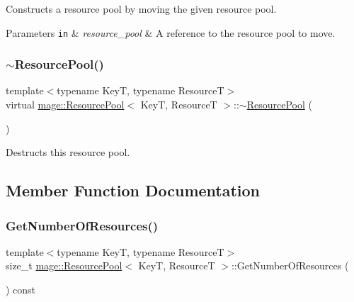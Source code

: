 Constructs a resource pool by moving the given resource pool.


\begin{DoxyParams}[1]{Parameters}
\mbox{\tt in}  & {\em resource\+\_\+pool} & A reference to the resource pool to move. \\
\hline
\end{DoxyParams}
\hypertarget{classmage_1_1_resource_pool_ae4fff3d951818d417f77965c2db265f6}{}\label{classmage_1_1_resource_pool_ae4fff3d951818d417f77965c2db265f6} 
\subsubsection{\texorpdfstring{$\sim$\+Resource\+Pool()}{~ResourcePool()}}
{\footnotesize\ttfamily template$<$typename KeyT, typename ResourceT$>$ \\
virtual \hyperlink{classmage_1_1_resource_pool}{mage\+::\+Resource\+Pool}$<$ KeyT, ResourceT $>$\+::$\sim$\hyperlink{classmage_1_1_resource_pool}{Resource\+Pool} (\begin{DoxyParamCaption}{ }\end{DoxyParamCaption})\hspace{0.3cm}{\ttfamily [virtual]}}

Destructs this resource pool. 

\subsection{Member Function Documentation}
\hypertarget{classmage_1_1_resource_pool_ae2f9964a1821c9b8cb38303a5a88c98e}{}\label{classmage_1_1_resource_pool_ae2f9964a1821c9b8cb38303a5a88c98e} 
\subsubsection{\texorpdfstring{Get\+Number\+Of\+Resources()}{GetNumberOfResources()}}
{\footnotesize\ttfamily template$<$typename KeyT, typename ResourceT$>$ \\
size\+\_\+t \hyperlink{classmage_1_1_resource_pool}{mage\+::\+Resource\+Pool}$<$ KeyT, ResourceT $>$\+::Get\+Number\+Of\+Resources (\begin{DoxyParamCaption}{ }\end{DoxyParamCaption}) const}

